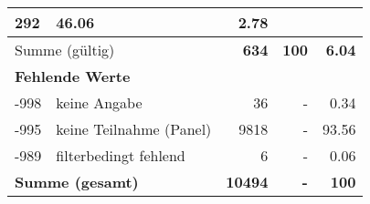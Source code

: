 \begin{longtable}{lXrrr}
       \num{292} &
       \num[round-mode=places,round-precision=2]{46.06} &
         \num[round-mode=places,round-precision=2]{2.78} \\
     \midrule
     \multicolumn{2}{l}{Summe (gültig)} &
       \textbf{\num{634}} &
     \textbf{\num{100}} &
       \textbf{\num[round-mode=places,round-precision=2]{6.04}} \\
     \multicolumn{5}{l}{\textbf{Fehlende Werte}}\\
       -998 &
       keine Angabe &
         \num{36} &
        - &
         \num[round-mode=places,round-precision=2]{0.34} \\
       -995 &
       keine Teilnahme (Panel) &
         \num{9818} &
        - &
         \num[round-mode=places,round-precision=2]{93.56} \\
       -989 &
       filterbedingt fehlend &
         \num{6} &
        - &
         \num[round-mode=places,round-precision=2]{0.06} \\
     \midrule
     \multicolumn{2}{l}{\textbf{Summe (gesamt)}} &
          \textbf{\num{10494}} &
        \textbf{-} &
        \textbf{\num{100}} \\
     \bottomrule
     \end{longtable}
     
